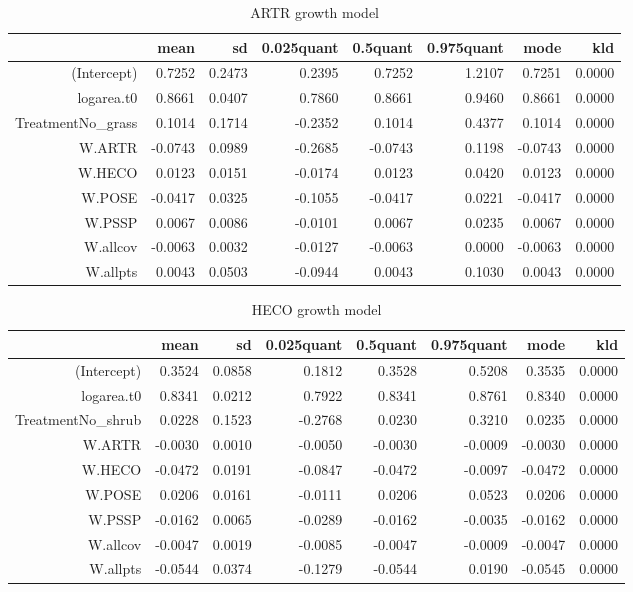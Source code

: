\begin{table}[ht]
\centering
\begin{tabular}{rrrrrrrr}
  \hline
 & mean & sd & 0.025quant & 0.5quant & 0.975quant & mode & kld \\ 
  \hline
(Intercept) & 0.7252 & 0.2473 & 0.2395 & 0.7252 & 1.2107 & 0.7251 & 0.0000 \\ 
  logarea.t0 & 0.8661 & 0.0407 & 0.7860 & 0.8661 & 0.9460 & 0.8661 & 0.0000 \\ 
  TreatmentNo\_grass & 0.1014 & 0.1714 & -0.2352 & 0.1014 & 0.4377 & 0.1014 & 0.0000 \\ 
  W.ARTR & -0.0743 & 0.0989 & -0.2685 & -0.0743 & 0.1198 & -0.0743 & 0.0000 \\ 
  W.HECO & 0.0123 & 0.0151 & -0.0174 & 0.0123 & 0.0420 & 0.0123 & 0.0000 \\ 
  W.POSE & -0.0417 & 0.0325 & -0.1055 & -0.0417 & 0.0221 & -0.0417 & 0.0000 \\ 
  W.PSSP & 0.0067 & 0.0086 & -0.0101 & 0.0067 & 0.0235 & 0.0067 & 0.0000 \\ 
  W.allcov & -0.0063 & 0.0032 & -0.0127 & -0.0063 & 0.0000 & -0.0063 & 0.0000 \\ 
  W.allpts & 0.0043 & 0.0503 & -0.0944 & 0.0043 & 0.1030 & 0.0043 & 0.0000 \\ 
   \hline
\end{tabular}
\caption{ARTR growth model} 
\label{ARTRgrowth}
\end{table}

\begin{table}[ht]
\centering
\begin{tabular}{rrrrrrrr}
  \hline
 & mean & sd & 0.025quant & 0.5quant & 0.975quant & mode & kld \\ 
  \hline
(Intercept) & 0.3524 & 0.0858 & 0.1812 & 0.3528 & 0.5208 & 0.3535 & 0.0000 \\ 
  logarea.t0 & 0.8341 & 0.0212 & 0.7922 & 0.8341 & 0.8761 & 0.8340 & 0.0000 \\ 
  TreatmentNo\_shrub & 0.0228 & 0.1523 & -0.2768 & 0.0230 & 0.3210 & 0.0235 & 0.0000 \\ 
  W.ARTR & -0.0030 & 0.0010 & -0.0050 & -0.0030 & -0.0009 & -0.0030 & 0.0000 \\ 
  W.HECO & -0.0472 & 0.0191 & -0.0847 & -0.0472 & -0.0097 & -0.0472 & 0.0000 \\ 
  W.POSE & 0.0206 & 0.0161 & -0.0111 & 0.0206 & 0.0523 & 0.0206 & 0.0000 \\ 
  W.PSSP & -0.0162 & 0.0065 & -0.0289 & -0.0162 & -0.0035 & -0.0162 & 0.0000 \\ 
  W.allcov & -0.0047 & 0.0019 & -0.0085 & -0.0047 & -0.0009 & -0.0047 & 0.0000 \\ 
  W.allpts & -0.0544 & 0.0374 & -0.1279 & -0.0544 & 0.0190 & -0.0545 & 0.0000 \\ 
   \hline
\end{tabular}
\caption{HECO growth model} 
\label{HECOgrowth}
\end{table}

